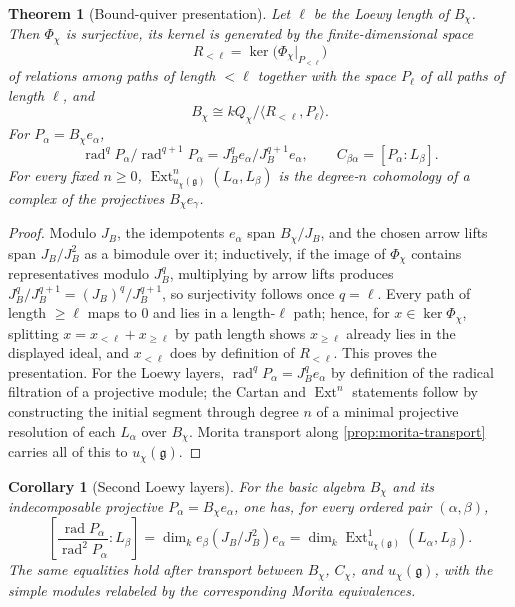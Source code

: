 \documentclass[11pt,reqno]{amsart}
\newtheorem{theorem}{Theorem}[section]
\newtheorem{corollary}[corollary]{Corollary}
\theoremstyle{definition}
\theoremstyle{remark}
\theoremstyle{definition}
\newcommand{\Ext}{\operatorname{Ext}}
\newcommand{\rad}{\operatorname{rad}}
\begin{document}
\begin{theorem}[Bound-quiver presentation]\label{thm:bound-quiver}
Let $\ell$ be the Loewy length of $B_\chi$.  Then $\Phi_\chi$ is
surjective, its kernel is generated by the finite-dimensional space
\[
 R_{<\ell}=\ker\bigl(\Phi_\chi|_{P_{<\ell}}\bigr)
\]
of relations among paths of length $<\ell$ together with the space
$P_\ell$ of all paths of length $\ell$, and
\[
 B_\chi\cong kQ_\chi/\langle R_{<\ell},P_\ell\rangle.
\]
For $P_\alpha=B_\chi e_\alpha$,
\[
 \rad^qP_\alpha/\rad^{q+1}P_\alpha=J_B^qe_\alpha/J_B^{q+1}e_\alpha,
 \qquad
 C_{\beta\alpha}=[P_\alpha:L_\beta].
\]
For every fixed $n\ge0$,
$\Ext^n_{u_\chi(\mathfrak g)}(L_\alpha,L_\beta)$ is the degree-$n$
cohomology of a complex of the projectives $B_\chi e_\gamma$.
\end{theorem}

\begin{proof}
Modulo $J_B$, the idempotents $e_\alpha$ span $B_\chi/J_B$, and the chosen
arrow lifts span $J_B/J_B^2$ as a bimodule over it; inductively, if the
image of $\Phi_\chi$ contains representatives modulo $J_B^q$, multiplying
by arrow lifts produces $J_B^q/J_B^{q+1}=(J_B)^q/J_B^{q+1}$, so surjectivity
follows once $q=\ell$.  Every path of length $\ge\ell$ maps to $0$ and lies
in a length-$\ell$ path; hence, for $x\in\ker\Phi_\chi$, splitting
$x=x_{<\ell}+x_{\ge\ell}$ by path length shows $x_{\ge\ell}$ already lies in
the displayed ideal, and $x_{<\ell}$ does by definition of $R_{<\ell}$.
This proves the presentation.  For the Loewy layers, $\rad^qP_\alpha=
J_B^qe_\alpha$ by definition of the radical filtration of a projective
module; the Cartan and $\Ext^n$ statements follow by constructing the initial segment through degree $n$
of a minimal projective resolution of each $L_\alpha$ over $B_\chi$.  Morita
transport along \cref{prop:morita-transport} carries all of this to
$u_\chi(\mathfrak g)$.
\end{proof}

\begin{corollary}[Second Loewy layers]
\label{cor:loewy-cartan}
For the basic algebra $B_\chi$ and its indecomposable projective
$P_\alpha=B_\chi e_\alpha$, one has, for every ordered pair
$(\alpha,\beta)$,
\[
 \left[\frac{\rad P_\alpha}{\rad^2P_\alpha}:L_\beta\right]
 =\dim_k e_\beta(J_B/J_B^2)e_\alpha
 =\dim_k\Ext^1_{u_\chi(\mathfrak g)}(L_\alpha,L_\beta).
\]
The same equalities hold after transport between
$B_\chi$, $C_\chi$, and $u_\chi(\mathfrak g)$, with the simple modules
relabeled by the corresponding Morita equivalences.
\end{corollary}
\end{document}
